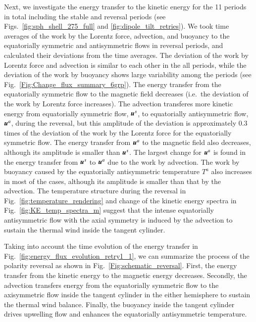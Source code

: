 Next, we investigate the energy transfer to the kinetic energy for the 11 periods in total including the stable and reversal periods (see Figs.\ \ref{fig:sph_shell_275_full} and \ref{fig:dipole_tilt_retries}).
We took time averages of the work by the Lorentz force, advection, and buoyancy to the equatorially symmetric and antisymmetric flows in reversal periods, and calculated their deviations from the time averages.
The deviation of the work by Lorentz force and advection is similar to each other in the all periods, while the deviation of the work by buoyancy shows large variability among the periods (see Fig.~\ref{Fig:Change_flux_summary_6grp}).
The energy transfer from the equatorially symmetric flow to the magnetic field decreases (i.e.\ the deviation of the work by Lorentz force increases). 
{\color {blue} 
The advection transferes more kinetic energy from equatorially symmetric flow, $\mbox{\boldmath$u$}^s$, to equatorially antisymmetric flow, $\mbox{\boldmath$u$}^a$, during the reversal, but this amplitude of the deviation is approximately 0.3 times of the deviation of the work by the Lorentz force for the equatorially symmetric flow.
}
{\color{magenta}
The energy transfer from $\mbox{\boldmath$u$}^a$ to the magnetic field also decreases, although its amplitude is smaller than $\mbox{\boldmath$u$}^s$.
}
The largest change for $\mbox{\boldmath$u$}^a$ is found in the energy transfer from $\mbox{\boldmath$u$}^s$ to $\mbox{\boldmath$u$}^a$ due to the work by advection. 
The work by buoyancy caused by the equatorially antisymmetric temperature $T^{a}$ also increases in most of the cases, although its amplitude is smaller than that by the advection. 
The temperature structure during the reversal in Fig.~\ref{fig:temperature_rendering} and change of the kinetic energy spectra in Fig.~\ref{fig:KE_temp_spectra_m} suggest that the intense equatorially antisymmetric flow with the axial symmetry is induced by the advection to sustain the thermal wind inside the tangent cylinder. 

Taking into account the time evolution of the energy transfer in Fig.~\ref{fig:energy_flux_evolution_retry1_1}, we can summarize the process of the polarity reversal as shown in Fig.~\ref{Fig:schematic_reversal}. 
First, the energy transfer 
{\color{teal}
from the kinetic energy
}
to the magnetic energy decreases. 
Secondly, the advection transfers energy from the equatorially symmetric flow to the axisymmetric flow inside the tangent cylinder in the either hemisphere to sustain the thermal wind balance. 
Finally, the buoyancy inside the tangent cylinder drives upwelling flow and enhances the equatorially antisymmetric temperature.

